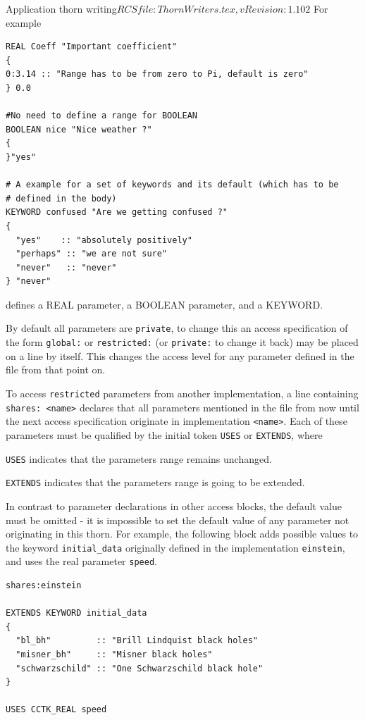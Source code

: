 \begin{cactuspart}{2}{Application thorn writing}{$RCSfile: ThornWriters.tex,v $}{$Revision: 1.102 $}
For example
\begin{verbatim}
REAL Coeff "Important coefficient"
{
0:3.14 :: "Range has to be from zero to Pi, default is zero"
} 0.0

#No need to define a range for BOOLEAN
BOOLEAN nice "Nice weather ?"
{
}"yes"

# A example for a set of keywords and its default (which has to be
# defined in the body)
KEYWORD confused "Are we getting confused ?"
{
  "yes"    :: "absolutely positively"
  "perhaps" :: "we are not sure"
  "never"   :: "never"
} "never"
\end{verbatim}
defines a REAL parameter, a BOOLEAN parameter, and a KEYWORD.

By default all parameters are {\tt private}, to change this an access
specification of the form {\tt global:} or {\tt restricted:} (or
{\tt private:} to change it back) may be placed on a line by itself.  This
changes the access level for any parameter defined in the file from that point on.

To access {\tt restricted} parameters from another implementation, a line
containing {\tt shares: <name>} declares that all parameters mentioned in
the file from now until the next access specification originate in
implementation {\tt <name>}. Each of these parameters must be qualified by the initial token {\tt USES} or {\tt EXTENDS}, where
\begin{Lentry}
\item[{\tt USES}] indicates that the parameters range remains unchanged.
\item[{\tt EXTENDS}] indicates that the parameters range is going to be extended.
\end{Lentry}

In contrast to parameter declarations in other access blocks, the default
value must be omitted - it is impossible to set the default value of any
parameter not originating in this thorn.
For example, the following block adds possible values to the keyword
{\tt initial\_data} originally defined in the implementation {\tt einstein},
and uses the real parameter {\tt speed}.

\begin{verbatim}
shares:einstein

EXTENDS KEYWORD initial_data
{
  "bl_bh"         :: "Brill Lindquist black holes"
  "misner_bh"     :: "Misner black holes"
  "schwarzschild" :: "One Schwarzschild black hole"
}

USES CCTK_REAL speed


\end{verbatim}
\end{cactuspart}
